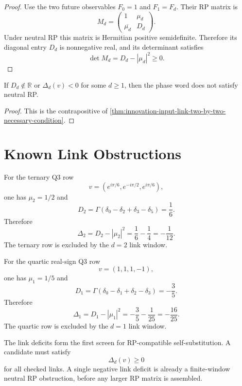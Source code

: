 \begin{proof}
Use the two future observables $F_0=1$ and $F_1=F_d$. Their RP matrix is
$$
M_d=
\left(
\begin{array}{cc}
1 & \mu_d\\
\overline{\mu_d} & D_d
\end{array}
\right).
$$
Under neutral RP this matrix is Hermitian positive semidefinite. Therefore
its diagonal entry $D_d$ is nonnegative real, and its determinant satisfies
$$
\det M_d=D_d-|\mu_d|^2\ge0.
$$
\end{proof}

\begin{corollary}
\label{cor:innovation-input-negative-link-deficit-obstruction}
If $D_d\notin\mathbb R$ or $\Delta_d(v)<0$ for some $d\ge1$, then the
phase word does not satisfy neutral RP.
\end{corollary}

\begin{proof}
This is the contrapositive of
\autoref{thm:innovation-input-link-two-by-two-necessary-condition}.
\end{proof}

\section{Known Link Obstructions}
\label{sec:innovation-input-known-link-obstructions}

\begin{principle}
\label{prin:innovation-input-ternary-link-obstruction}
For the ternary Q3 row
$$
v=(e^{i\pi/6},e^{-i\pi/2},e^{i\pi/6}),
$$
one has $\mu_2=1/2$ and
$$
D_2=
\Gamma(\delta_0-\delta_2+\delta_3-\delta_5)
=
\frac16.
$$
Therefore
$$
\Delta_2
=
D_2-|\mu_2|^2
=
\frac16-\frac14
=
-\frac1{12}.
$$
The ternary row is excluded by the $d=2$ link window.
\end{principle}

\begin{principle}
\label{prin:innovation-input-quartic-link-obstruction}
For the quartic real-sign Q3 row
$$
v=(1,1,1,-1),
$$
one has $\mu_1=1/5$ and
$$
D_1=
\Gamma(\delta_0-\delta_1+\delta_2-\delta_3)
=
-\frac35.
$$
Therefore
$$
\Delta_1
=
D_1-|\mu_1|^2
=
-\frac35-\frac1{25}
=
-\frac{16}{25}.
$$
The quartic row is excluded by the $d=1$ link window.
\end{principle}

\begin{principle}
\label{prin:innovation-input-first-rp-screen}
The link deficits form the first screen for RP-compatible
self-substitution. A candidate must satisfy
$$
\Delta_d(v)\ge0
$$
for all checked links. A single negative link deficit is already a
finite-window neutral RP obstruction, before any larger RP matrix is
assembled.
\end{principle}

